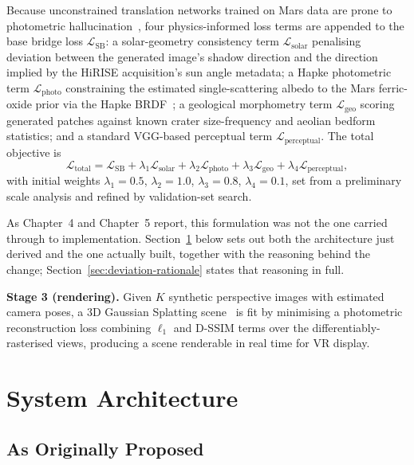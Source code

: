 Because unconstrained translation networks trained on Mars data are prone to photometric hallucination~\cite{aithal2024hallucination,rathkopf2025reliability}, four physics-informed loss terms are appended to the base bridge loss $\mathcal{L}_{\mathrm{SB}}$: a solar-geometry consistency term $\mathcal{L}_{\mathrm{solar}}$ penalising deviation between the generated image's shadow direction and the direction implied by the HiRISE acquisition's sun angle metadata; a Hapke photometric term $\mathcal{L}_{\mathrm{photo}}$ constraining the estimated single-scattering albedo to the Mars ferric-oxide prior via the Hapke BRDF~\cite{hapke2012theory}; a geological morphometry term $\mathcal{L}_{\mathrm{geo}}$ scoring generated patches against known crater size-frequency and aeolian bedform statistics; and a standard VGG-based perceptual term $\mathcal{L}_{\mathrm{perceptual}}$. The total objective is
\begin{equation}
  \mathcal{L}_{\mathrm{total}} =
    \mathcal{L}_{\mathrm{SB}}
    + \lambda_1 \mathcal{L}_{\mathrm{solar}}
    + \lambda_2 \mathcal{L}_{\mathrm{photo}}
    + \lambda_3 \mathcal{L}_{\mathrm{geo}}
    + \lambda_4 \mathcal{L}_{\mathrm{perceptual}},
  \label{eq:l_total}
\end{equation}
with initial weights $\lambda_1=0.5$, $\lambda_2=1.0$, $\lambda_3=0.8$, $\lambda_4=0.1$, set from a preliminary scale analysis and refined by validation-set search.

As Chapter~4 and Chapter~5 report, this formulation was not the one carried through to implementation. Section~\ref{sec:architecture} below sets out both the architecture just derived and the one actually built, together with the reasoning behind the change; Section~\ref{sec:deviation-rationale} states that reasoning in full.

\textbf{Stage 3 (rendering).} Given $K$ synthetic perspective images with estimated camera poses, a 3D Gaussian Splatting scene~\cite{kerbl2023gaussian} is fit by minimising a photometric reconstruction loss combining $\ell_1$ and D-SSIM terms over the differentiably-rasterised views, producing a scene renderable in real time for VR display.

\section{System Architecture}
\label{sec:architecture}

\subsection{As Originally Proposed}
\label{sec:architecture-original}

